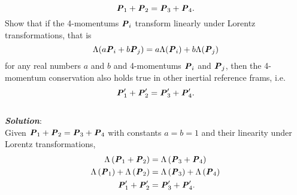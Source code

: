 \documentclass[10pt,a4paper]{article}
\theoremstyle{break}
\begin{document}
\begin{enumerate}
      \[\textbf{\textit{P}}_1 + \textbf{\textit{P}}_2 = \textbf{\textit{P}}_3 + \textbf{\textit{P}}_4.\]
    Show that if the 4-momentums $\textbf{\textit{P}}_i$ transform linearly under Lorentz transformations, that is
      \[\Lambda(a\textbf{\textit{P}}_i + b \textbf{\textit{P}}_j) = a \Lambda(\textbf{\textit{P}}_i)+b \Lambda(\textbf{\textit{P}}_j)\]
    for any real numbers $a$ and $b$ and 4-momentums $\textbf{\textit{P}}_i$ and $\textbf{\textit{P}}_j$, then the 4-momentum conservation also holds true in other inertial reference frams, i.e.
      \[\textbf{\textit{P}}_1' + \textbf{\textit{P}}_2' = \textbf{\textit{P}}_3' + \textbf{\textit{P}}_4'.\]
      \newline\\
      \textbf{\textit{Solution}}:
      \newline\\
      Given $\textbf{\textit{P}}_1 + \textbf{\textit{P}}_2 = \textbf{\textit{P}}_3 + \textbf{\textit{P}}_4$ with constants $a=b=1$ and their linearity under Lorentz transformations,
      \begin{equation*}
        \begin{split}
          \Lambda \left(\textbf{\textit{P}}_1 + \textbf{\textit{P}}_2\right) &= \Lambda \left(\textbf{\textit{P}}_3 + \textbf{\textit{P}}_4\right)\\
          \Lambda \left(\textbf{\textit{P}}_1\right) + \Lambda \left(\textbf{\textit{P}}_2\right) &= \Lambda \left(\textbf{\textit{P}}_3\right) + \Lambda \left(\textbf{\textit{P}}_4\right)\\
          \textbf{\textit{P}}_1' + \textbf{\textit{P}}_2' &= \textbf{\textit{P}}_3' + \textbf{\textit{P}}_4'.
        \end{split}
      \end{equation*}
    \end{enumerate}
\end{document}
